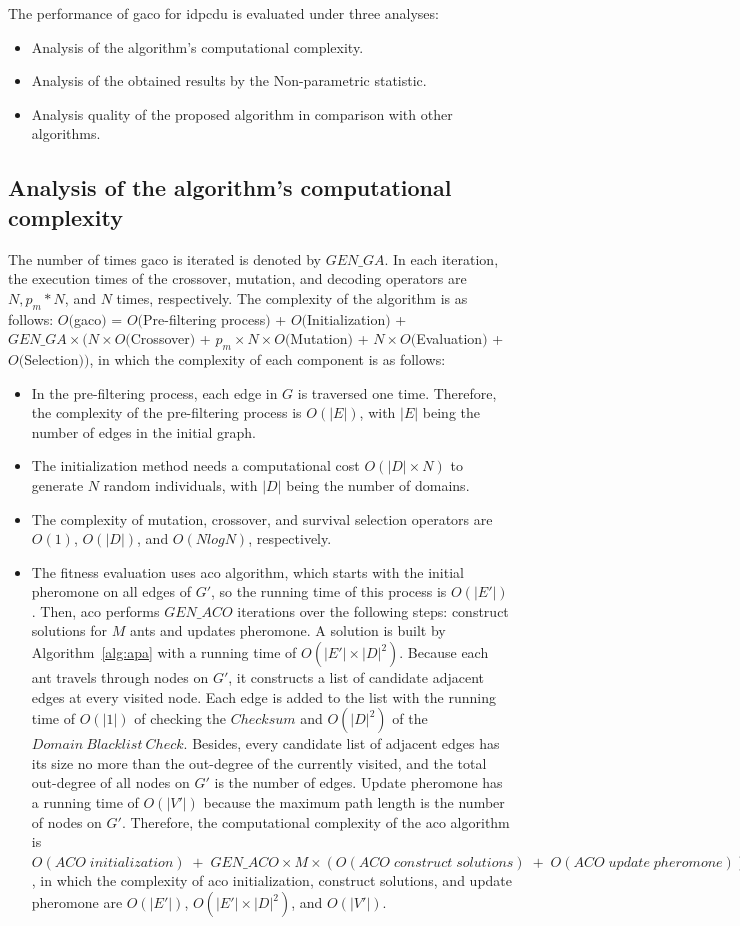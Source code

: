 The performance of \acrshort{gaco} for \gls{idpcdu} is evaluated under three analyses:
\begin{itemize}
	\item Analysis of the algorithm's computational complexity.
	\item Analysis of the obtained results by the Non-parametric statistic.
	\item Analysis quality of the proposed algorithm in comparison with other algorithms.
\end{itemize}

\subsection{Analysis of the algorithm's computational complexity}
The number of times \acrshort{gaco} is iterated is denoted by $GEN\_GA$. In each iteration, the execution times of the crossover, mutation, and decoding operators are $N, p_m * N$, and $N$ times, respectively. The complexity of the algorithm is as follows:
$O($\acrshort{gaco}$)$ = $O($Pre-filtering process$)$ + $O($Initialization$)$ + $GEN\_GA\times \bigg(N \times O($Crossover$)$ + $p_{m}\times N\times O($Mutation$)$ + $N\times O($Evaluation$)$ + $O($Selection$)\bigg)$, in which the complexity of each component is as follows:
\begin{itemize}
	\item In the pre-filtering process, each edge in $G$ is traversed  one time. Therefore, the complexity of the pre-filtering process is $O(|E|)$, with $|E|$ being the number of edges in the initial graph.
	\item The initialization method needs a computational cost $O(|D|\times N)$ to generate $N$ random individuals, with $|D|$ being the number of domains.
	\item The complexity of mutation, crossover, and survival selection operators are $O(1)$, $O(|D|)$, and $O(NlogN)$, respectively.
	\item The fitness evaluation uses \gls{aco} algorithm, which starts with the initial pheromone on all edges of $G'$, so the running time of this process is $O(|E'|)$. Then, \gls{aco} performs $GEN\_ACO$ iterations over the following steps: construct solutions for $M$ ants and updates pheromone. A solution is built by Algorithm~\ref{alg:apa} with a running time of $O(|E'|\times |D|^2)$. Because each ant travels through nodes on $G'$, it constructs a list of candidate adjacent edges at every visited node. Each edge is added to the list with the running time of $O(|1|)$ of checking the $Checksum$ and $O(|D|^2)$ of the $Domain~Blacklist~Check$. Besides, every candidate list of adjacent edges has its size no more than the out-degree of the currently visited, and the total out-degree of all nodes on $G'$ is the number of edges. Update pheromone has a running time of $O(|V'|)$ because the maximum path length is the number of nodes on $G'$. Therefore, the computational complexity of the \gls{aco} algorithm is $O(ACO\;initialization)\;+\;GEN\_ACO\times M\times (O(ACO\;construct\;solutions)\;+\;O(ACO\;update\;pheromone))$, in which the complexity of \gls{aco} initialization, construct solutions, and update pheromone are $O(|E'|)$, $O(|E'|\times |D|^2)$, and $O(|V'|)$.
\end{itemize}
